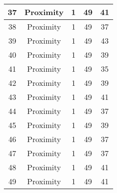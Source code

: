 \documentclass[results.tex]{subfiles}
\begin{document}
\begin{center}
\begin{tabular}{| c || c | c | c | c |}
            \hline
            37                      & Proximity                    & 1                      & 49                      & 41                   \\
            \hline
            38                      & Proximity                    & 1                      & 49                      & 37                   \\
            \hline
            39                      & Proximity                    & 1                      & 49                      & 43                   \\
            \hline
            40                      & Proximity                    & 1                      & 49                      & 39                   \\
            \hline
            41                      & Proximity                    & 1                      & 49                      & 35                   \\
            \hline
            42                      & Proximity                    & 1                      & 49                      & 39                   \\
            \hline
            43                      & Proximity                    & 1                      & 49                      & 41                   \\
            \hline
            44                      & Proximity                    & 1                      & 49                      & 37                   \\
            \hline
            45                      & Proximity                    & 1                      & 49                      & 39                   \\
            \hline
            46                      & Proximity                    & 1                      & 49                      & 37                   \\
            \hline
            47                      & Proximity                    & 1                      & 49                      & 37                   \\
            \hline
            48                      & Proximity                    & 1                      & 49                      & 41                   \\
            \hline
            49                      & Proximity                    & 1                      & 49                      & 41                   \\
            \hline
        \end{tabular}
    \end{center}
\end{document}
